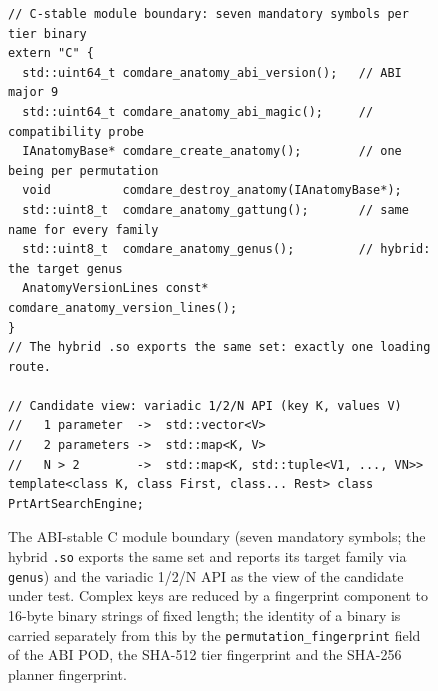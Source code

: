 \begin{nurlang}
\begin{figure}[!htbp]
\begin{lstlisting}[basicstyle=\footnotesize\ttfamily,frame=single,xleftmargin=1.5em]
// C-stable module boundary: seven mandatory symbols per tier binary
extern "C" {
  std::uint64_t comdare_anatomy_abi_version();   // ABI major 9
  std::uint64_t comdare_anatomy_abi_magic();     // compatibility probe
  IAnatomyBase* comdare_create_anatomy();        // one being per permutation
  void          comdare_destroy_anatomy(IAnatomyBase*);
  std::uint8_t  comdare_anatomy_gattung();       // same name for every family
  std::uint8_t  comdare_anatomy_genus();         // hybrid: the target genus
  AnatomyVersionLines const* comdare_anatomy_version_lines();
}
// The hybrid .so exports the same set: exactly one loading route.

// Candidate view: variadic 1/2/N API (key K, values V)
//   1 parameter  ->  std::vector<V>
//   2 parameters ->  std::map<K, V>
//   N > 2        ->  std::map<K, std::tuple<V1, ..., VN>>
template<class K, class First, class... Rest> class PrtArtSearchEngine;
\end{lstlisting}
  \caption{The ABI-stable C module boundary (seven mandatory symbols; the hybrid \texttt{.so} exports the same set
  and reports its target family via \texttt{genus}) and the variadic 1/2/N API as the view of the candidate under test.
  Complex keys are reduced by a fingerprint component to 16-byte binary strings of fixed length; the
  identity of a binary is carried separately from this by the \texttt{permutation\_fingerprint} field of
  the ABI POD, the SHA-512 tier fingerprint and the SHA-256 planner fingerprint.}\label{fig:abi}
\end{figure}
\end{nurlang}

